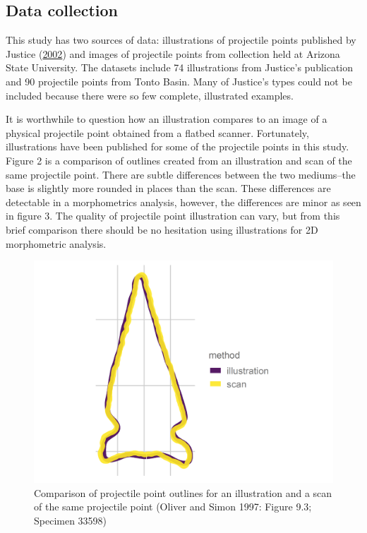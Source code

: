 \documentclass{article}
\begin{document}
\hypertarget{data-collection}{%
\subsection{Data collection}\label{data-collection}}

This study has two sources of data: illustrations of projectile points
published by Justice (\protect\hyperlink{ref-Justice2002-cf}{2002}) and
images of projectile points from collection held at Arizona State
University. The datasets include 74 illustrations from Justice's
publication and 90 projectile points from Tonto Basin. Many of Justice's
types could not be included because there were so few complete,
illustrated examples.

It is worthwhile to question how an illustration compares to an image of
a physical projectile point obtained from a flatbed scanner.
Fortunately, illustrations have been published for some of the
projectile points in this study. Figure 2 is a comparison of outlines
created from an illustration and scan of the same projectile point.
There are subtle differences between the two mediums--the base is
slightly more rounded in places than the scan. These differences are
detectable in a morphometrics analysis, however, the differences are
minor as seen in figure 3. The quality of projectile point illustration
can vary, but from this brief comparison there should be no hesitation
using illustrations for 2D morphometric analysis.

\begin{figure}
\includegraphics[width=1\linewidth]{figures/pointComparison} \caption{Comparison of projectile point outlines for an illustration and a scan of the same projectile point (Oliver and Simon 1997: Figure 9.3; Specimen 33598)}\label{fig:pointComparison}
\end{figure}
\end{document}
